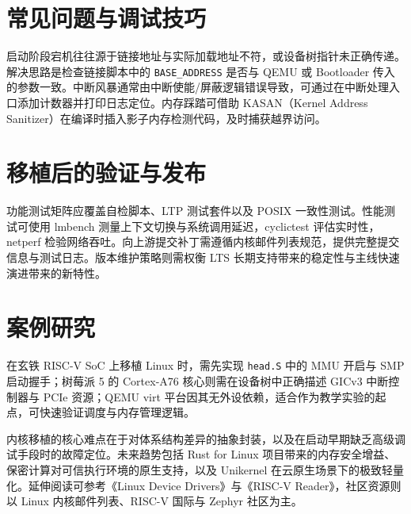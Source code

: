 \chapter{常见问题与调试技巧}
启动阶段宕机往往源于链接地址与实际加载地址不符，或设备树指针未正确传递。解决思路是检查链接脚本中的 \texttt{BASE\_{}ADDRESS} 是否与 QEMU 或 Bootloader 传入的参数一致。中断风暴通常由中断使能/屏蔽逻辑错误导致，可通过在中断处理入口添加计数器并打印日志定位。内存踩踏可借助 KASAN（Kernel Address Sanitizer）在编译时插入影子内存检测代码，及时捕获越界访问。\par
\chapter{移植后的验证与发布}
功能测试矩阵应覆盖自检脚本、LTP 测试套件以及 POSIX 一致性测试。性能测试可使用 lmbench 测量上下文切换与系统调用延迟，cyclictest 评估实时性，netperf 检验网络吞吐。向上游提交补丁需遵循内核邮件列表规范，提供完整提交信息与测试日志。版本维护策略则需权衡 LTS 长期支持带来的稳定性与主线快速演进带来的新特性。\par
\chapter{案例研究}
在玄铁 RISC-V SoC 上移植 Linux 时，需先实现 \texttt{head.S} 中的 MMU 开启与 SMP 启动握手；树莓派 5 的 Cortex-A76 核心则需在设备树中正确描述 GICv3 中断控制器与 PCIe 资源；QEMU virt 平台因其无外设依赖，适合作为教学实验的起点，可快速验证调度与内存管理逻辑。\par
内核移植的核心难点在于对体系结构差异的抽象封装，以及在启动早期缺乏高级调试手段时的故障定位。未来趋势包括 Rust for Linux 项目带来的内存安全增益、保密计算对可信执行环境的原生支持，以及 Unikernel 在云原生场景下的极致轻量化。延伸阅读可参考《Linux Device Drivers》与《RISC-V Reader》，社区资源则以 Linux 内核邮件列表、RISC-V 国际与 Zephyr 社区为主。\par
